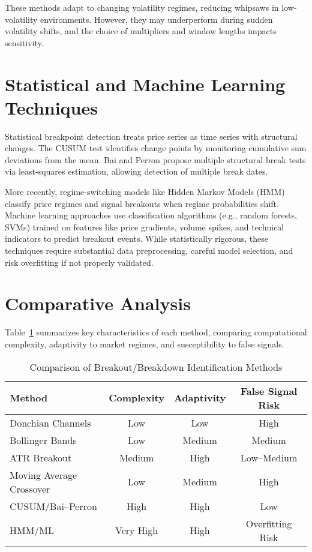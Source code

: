 \documentclass{article}
\begin{document}
These methods adapt to changing volatility regimes, reducing whipsaws in low-volatility environments. However, they may underperform during sudden volatility shifts, and the choice of multipliers and window lengths impacts sensitivity.

\section{Statistical and Machine Learning Techniques}
Statistical breakpoint detection treats price series as time series with structural changes. The CUSUM test \cite{page1954} identifies change points by monitoring cumulative sum deviations from the mean. Bai and Perron \cite{bai1998} propose multiple structural break tests via least-squares estimation, allowing detection of multiple break dates.

More recently, regime-switching models like Hidden Markov Models (HMM) \cite{rabiner1989} classify price regimes and signal breakouts when regime probabilities shift. Machine learning approaches use classification algorithms (e.g., random forests, SVMs) trained on features like price gradients, volume spikes, and technical indicators to predict breakout events. While statistically rigorous, these techniques require substantial data preprocessing, careful model selection, and risk overfitting if not properly validated.

\section{Comparative Analysis}

Table~\ref{tab:comparison} summarizes key characteristics of each method, comparing computational complexity, adaptivity to market regimes, and susceptibility to false signals.

\begin{table}[h!]
\centering
\begin{tabular}{lccc}
\hline
Method & Complexity & Adaptivity & False Signal Risk \\
\hline
Donchian Channels & Low & Low & High \\
Bollinger Bands & Low & Medium & Medium \\
ATR Breakout & Medium & High & Low–Medium \\
Moving Average Crossover & Low & Medium & High \\
CUSUM/Bai–Perron & High & High & Low \\
HMM/ML & Very High & High & Overfitting Risk \\
\hline
\end{tabular}
\caption{Comparison of Breakout/Breakdown Identification Methods}
\label{tab:comparison}
\end{table}
\end{document}
